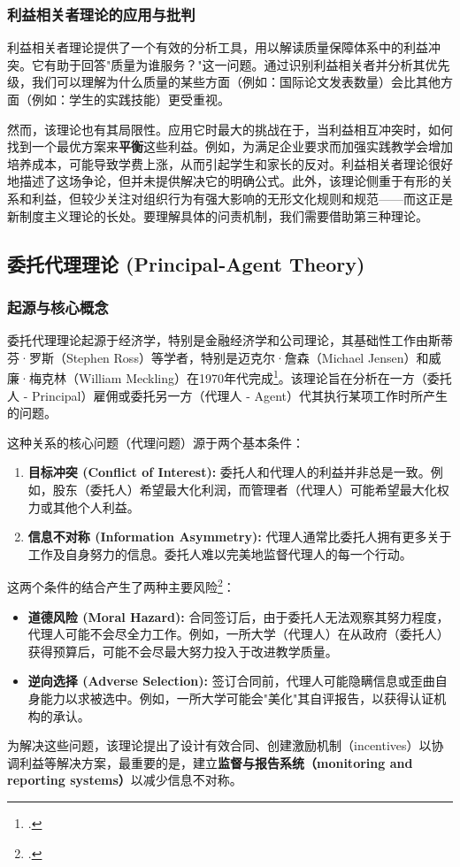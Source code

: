 \subsubsection{利益相关者理论的应用与批判}

利益相关者理论提供了一个有效的分析工具，用以解读质量保障体系中的利益冲突。它有助于回答"质量为谁服务？"这一问题。通过识别利益相关者并分析其优先级，我们可以理解为什么质量的某些方面（例如：国际论文发表数量）会比其他方面（例如：学生的实践技能）更受重视。

然而，该理论也有其局限性。应用它时最大的挑战在于，当利益相互冲突时，如何找到一个最优方案来\textbf{平衡}这些利益。例如，为满足企业要求而加强实践教学会增加培养成本，可能导致学费上涨，从而引起学生和家长的反对。利益相关者理论很好地描述了这场争论，但并未提供解决它的明确公式。此外，该理论侧重于有形的关系和利益，但较少关注对组织行为有强大影响的无形文化规则和规范——而这正是新制度主义理论的长处。要理解具体的问责机制，我们需要借助第三种理论。

\subsection{委托代理理论 (Principal-Agent Theory)}
\label{subsec:uy_nhiem_nen_tang}

\subsubsection{起源与核心概念}
委托代理理论起源于经济学，特别是金融经济学和公司理论，其基础性工作由斯蒂芬·罗斯（Stephen Ross）等学者，特别是迈克尔·詹森（Michael Jensen）和威廉·梅克林（William Meckling）在1970年代完成\footcite{JensenMeckling1976}。该理论旨在分析在一方（委托人 - Principal）雇佣或委托另一方（代理人 - Agent）代其执行某项工作时所产生的问题。

这种关系的核心问题（代理问题）源于两个基本条件：
\begin{enumerate}
    \item \textbf{目标冲突 (Conflict of Interest):} 委托人和代理人的利益并非总是一致。例如，股东（委托人）希望最大化利润，而管理者（代理人）可能希望最大化权力或其他个人利益。
    \item \textbf{信息不对称 (Information Asymmetry):} 代理人通常比委托人拥有更多关于工作及自身努力的信息。委托人难以完美地监督代理人的每一个行动。
\end{enumerate}
这两个条件的结合产生了两种主要风险\footcite{Eisenhardt1989}：
\begin{itemize}
    \item \textbf{道德风险 (Moral Hazard):} 合同签订后，由于委托人无法观察其努力程度，代理人可能不会尽全力工作。例如，一所大学（代理人）在从政府（委托人）获得预算后，可能不会尽最大努力投入于改进教学质量。
    \item \textbf{逆向选择 (Adverse Selection):} 签订合同前，代理人可能隐瞒信息或歪曲自身能力以求被选中。例如，一所大学可能会"美化"其自评报告，以获得认证机构的承认。
\end{itemize}
为解决这些问题，该理论提出了设计有效合同、创建激励机制（incentives）以协调利益等解决方案，最重要的是，建立\textbf{监督与报告系统（monitoring and reporting systems）}以减少信息不对称。


